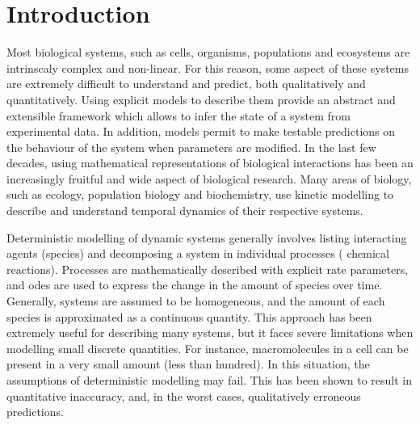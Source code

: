 \section{Introduction} \label{intro}

Most biological systems, such as cells, organisms, populations and ecosystems are intrinscaly complex and non-linear.
For this reason, some aspect of these systems are extremely difficult to understand and predict, both qualitatively and quantitatively\cite{klipp_systems_2013}.
Using explicit models to describe them provide an abstract and extensible framework which allows to infer the state of a system from experimental data.
In addition, models permit to make testable predictions on the behaviour of the system when parameters are modified.
In the last few decades, using mathematical representations of biological interactions has been an increasingly fruitful and wide aspect of biological research.
Many areas of biology, such as ecology, population biology and biochemistry,
use kinetic modelling to describe and understand temporal dynamics of their respective systems.

Deterministic modelling of dynamic systems generally involves listing
interacting agents (species) and decomposing a system in individual processes (\eg{} chemical reactions).
Processes are mathematically described with explicit rate parameters, and \glspl{ode} are used to express the change in the amount of species over time.
Generally, systems are assumed to be homogeneous, and the amount of each species is approximated as a continuous quantity.
This approach has been extremely useful for describing many systems, but it faces severe limitations when modelling small discrete quantities.
For instance, macromolecules in a cell can be present in a very small amount (less than hundred)\cite{ghaemmaghami_global_2003}.
In this situation, the assumptions of deterministic modelling may fail.
This has been shown to result in quantitative inaccuracy, and, in the worst cases, qualitatively erroneous predictions.


